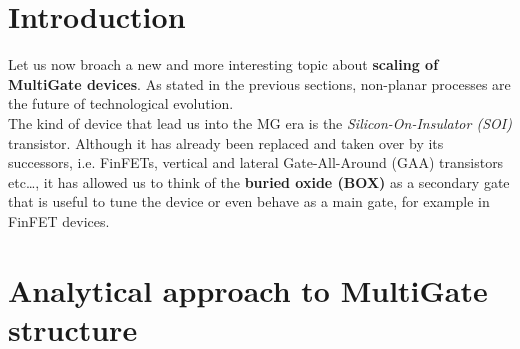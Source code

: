 \documentclass[a4paper, 12pt, twoside, openright]{report}
\begin{document}
\section{Introduction}
Let us now broach a new and more interesting topic about \textbf{scaling of MultiGate devices}. As stated in the previous sections, non-planar processes are the future of technological evolution.\\
The kind of device that lead us into the MG era is the \emph{Silicon-On-Insulator (SOI)} transistor. Although it has already been replaced and taken over by its successors, i.e. FinFETs, vertical and lateral Gate-All-Around (GAA) transistors etc\dots, it has allowed us to think of the \textbf{buried oxide (BOX)} as a secondary gate that is useful to tune the device or even behave as a main gate, for example in FinFET devices. 



\section{Analytical approach to MultiGate structure}
\end{document}
